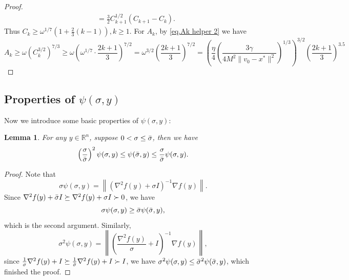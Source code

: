 \documentclass{article}
\newtheorem{lemma}[theorem]{Lemma}
\numberwithin{equation}{section}
\numberwithin{equation}{section}
\begin{document}
\begin{proof}
\begin{equation*}
\begin{aligned}
                                           & =\frac{3}{2} C_{k+1}^{1 / 2}\left(C_{k+1}-C_k\right).
        \end{aligned}
    \end{equation*}
    Thus $C_k \geq \omega^{1 / 7}\left(1+\frac{2}{3}(k-1)\right), k \geq 1$. For $A_k$, by \eqref{eq.Ak helper 2} we have
    \begin{equation*}
        A_k  \geq \omega\left(C_k^{3 / 2}\right)^{7 / 3} \geq \omega\left(\omega^{1 / 7} \cdot \frac{2 k+1}{3}\right)^{7 / 2}=\omega^{3 / 2}\left(\frac{2 k+1}{3}\right)^{7 / 2}
        =\left(\frac{\eta}{4}\left (\frac{3\gamma}{4M^2\|v_0-x^*\|^2}\right)^{1/3}\right)^{3 / 2}\left(\frac{2 k+1}{3}\right)^{3.5}
    \end{equation*}
\end{proof}
\subsection*{Properties of $\psi(\sigma,y)$}
Now we introduce some basic properties of $\psi(\sigma,y)$:
\begin{lemma}
    \label{lem.psi property wrt sigma}
    For any $y\in\mathbb{R}^n$, suppose $0<\sigma\leq \Bar{\sigma}$, then we have
    \begin{equation}
        \label{eq.psi property wrt sigma}
        \left(\frac{\sigma}{\Bar{\sigma}}\right)^2 \psi(\sigma,y)\leq \psi(\Bar{\sigma},y) \leq \frac{\sigma}{\Bar{\sigma}}\psi(\sigma,y).
    \end{equation}
\end{lemma}
\begin{proof}
    Note that
    \begin{equation*}
        \sigma \psi(\sigma,y) = \left \| \left(\nabla^2 f(y)+\sigma I \right)^{-1}\nabla f(y)\right \|.
    \end{equation*}
    Since $\nabla^2 f(y)+\Bar{\sigma} I\succeq \nabla^2 f(y)+\sigma I \succ 0$, we have
    \begin{equation*}
        \sigma \psi(\sigma,y) \geq \Bar{\sigma} \psi(\Bar{\sigma},y),
    \end{equation*}
    which is the second argument. Similarly,
    \begin{equation*}
        \sigma^2 \psi(\sigma,y) = \left \| \left(\frac{\nabla^2 f(y)}{\sigma}+ I \right)^{-1}\nabla f(y)\right \|,
    \end{equation*}
    since $\frac{1}{\sigma}\nabla^2 f(y)+I\succeq \frac{1}{\Bar{\sigma}}\nabla^2 f(y)+I\succ I$, we have $\sigma^2 \psi(\sigma,y)\leq \Bar{\sigma}^2 \psi(\Bar{\sigma},y)$, which finished the proof.
\end{proof}
\end{document}
